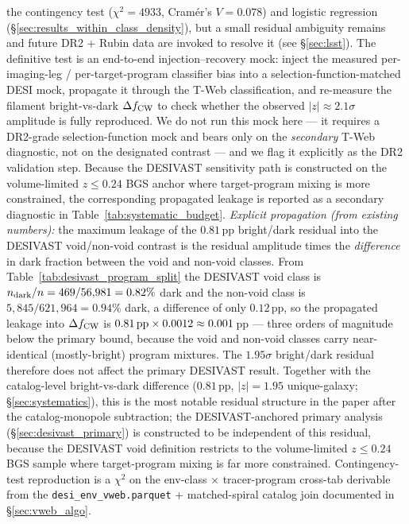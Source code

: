 \documentclass[aps,prd,twocolumn,superscriptaddress,showpacs,preprintnumbers,nofootinbib,longbibliography,floatfix]{revtex4-2}
\begin{document}
the contingency test ($\chi^2\!=\!4933$, Cram\'{e}r's $V\!=\!0.078$)
and logistic regression (\S\ref{sec:results_within_class_density}),
but a small residual ambiguity remains and future DR2 + Rubin data
are invoked to resolve it (see \S\ref{sec:lsst}). The definitive test
is an end-to-end injection--recovery mock: inject the measured
per-imaging-leg / per-target-program classifier bias into a
selection-function-matched DESI mock, propagate it through the
T-Web classification, and re-measure the filament bright-vs-dark
$\Delta f_{\rm CW}$ to check whether the observed
$|z|\!\approx\!2.1\sigma$ amplitude is fully reproduced. We do not run
this mock here --- it requires a DR2-grade selection-function mock and
bears only on the \emph{secondary} T-Web diagnostic, not on the designated contrast
--- and we flag it explicitly as the DR2 validation step. Because the
DESIVAST sensitivity path is constructed on the volume-limited $z\!\le\!0.24$
BGS anchor where target-program mixing is more constrained, the
corresponding propagated leakage is reported as a secondary diagnostic
in Table~\ref{tab:systematic_budget}.
\emph{Explicit propagation (from existing numbers):} the maximum leakage
of the $0.81$\,pp bright/dark residual into the DESIVAST void/non-void
contrast is the residual amplitude times the \emph{difference} in dark
fraction between the void and non-void classes. From
Table~\ref{tab:desivast_program_split} the DESIVAST void class is
$n_{\rm dark}/n = 469/56{,}981 = 0.82\%$ dark and the non-void class is
$5{,}845/621{,}964 = 0.94\%$ dark, a difference of only $0.12$\,pp, so the
propagated leakage into $\Delta f_{\rm CW}$ is
$0.81\,{\rm pp}\times 0.0012 \approx 0.001$\,pp --- three orders of
magnitude below the primary bound, because the void and non-void classes
carry near-identical (mostly-bright) program mixtures. The $1.95\sigma$
bright/dark residual therefore does not affect the primary DESIVAST
result.
Together with the catalog-level bright-vs-dark difference
($0.81$\,pp, $|z| = 1.95$ unique-galaxy; \S\ref{sec:systematics}), this is the
most notable residual structure in the paper after
the catalog-monopole subtraction; the DESIVAST-anchored primary
analysis (\S\ref{sec:desivast_primary}) is constructed to be
independent of this residual, because the DESIVAST void definition
restricts to the volume-limited $z \leq 0.24$ BGS sample where
target-program mixing is far more constrained. Contingency-test reproduction is a $\chi^{2}$ on the env-class
$\times$ tracer-program cross-tab derivable from the
\texttt{desi\_env\_vweb.parquet} + matched-spiral catalog join
documented in \S\ref{sec:vweb_algo}.
\end{document}
